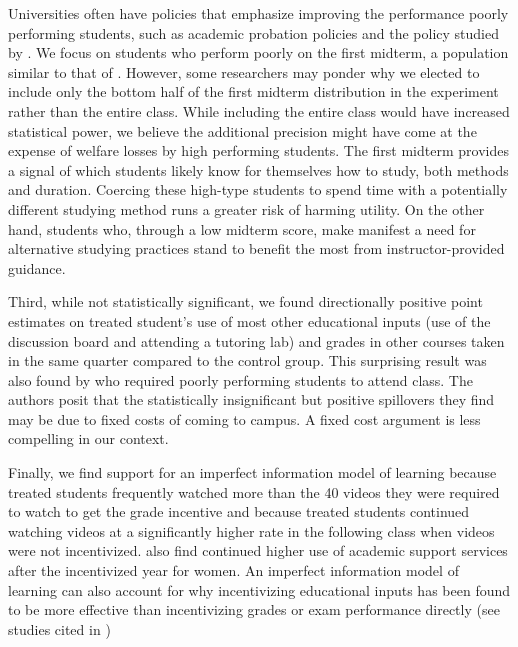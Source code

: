 \documentclass[12pt]{article}
\begin{document}
Universities often have policies that emphasize improving the performance poorly performing students, such as academic probation policies and the policy studied by \textcite{kow2020}. We focus on students who perform poorly on the first midterm, a population similar to that of \textcite{dgm2010}. However, some researchers may ponder why we elected to include only the bottom half of the first midterm distribution in the experiment rather than the entire class. While including the entire class would have increased statistical power, we believe the additional precision might have come at the expense of welfare losses by high performing students. The first midterm provides a signal of which students likely know for themselves how to study, both methods and duration. Coercing these high-type students to spend time with a potentially different studying method runs a greater risk of harming utility. On the other hand, students who, through a low midterm score, make manifest a need for alternative studying practices stand to benefit the most from instructor-provided guidance.

Third, while not statistically significant, we found directionally positive point estimates on treated student's use of most other educational inputs (use of the discussion board and attending a tutoring lab) and grades in other courses taken in the same quarter compared to the control group. This surprising result was also found by \textcite{dgm2010} who required poorly performing students to attend class. The authors posit that the statistically insignificant but positive spillovers they find may be due to fixed costs of coming to campus. A fixed cost argument is less compelling in our context.

Finally, we find support for an imperfect information model of learning because treated students frequently watched more than the 40 videos they were required to watch to get the grade incentive and because treated students continued watching videos at a significantly higher rate in the following class when videos were not incentivized. \textcite{alo2009} also find continued higher use of academic support services after the incentivized year for women. An imperfect information model of learning can also account for why incentivizing educational inputs has been found to be more effective than incentivizing grades or exam performance directly (see studies cited in \textcite{gmr2011})
\end{document}
